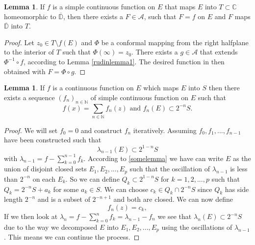 \documentclass[a4paper,12pt,twoside,BCOR=10mm]{scrbook}
\theoremstyle{definition}
\theoremstyle{definition}
\newtheorem{lemma}[theorem]{Lemma}
\theoremstyle{definition}
\begin{document}
\begin{lemma}
\label{rudinlemma2}
If $f$ is a simple continuous function on $E$ that maps $E$ into $T \subset \mathbb{C}$ homeomorphic to $\overline{\mathbb{D}}$, then there exists a $F \in \mathcal{A}$, such that $F = f$ on $E$ and $F$ maps $\overline{\mathbb{D}}$ into $T$.
\end{lemma}
\begin{proof}
Let $z_0 \in T \setminus f(E)$ and $\Phi$ be a conformal mapping from the right halfplane to the interior of $T$ such that $\Phi(\infty) = z_0$.
There exists a $g \in \mathcal{A}$ that extends $\Phi^{-1} \circ f$, according to Lemma \ref{rudinlemma1}.
The desired function in then obtained with $F = \Phi \circ g$.
\end{proof}
\begin{lemma}
\label{rudinlemma3}
If $f$ is a continuous function on $E$ which maps $E$ into $S$ then there exists a sequence $(f_n)_{n \in \mathbb{N}}$ of simple continuous function on $E$ such that
\[
	f(x) = \sum_{n \in \mathbb{N}} f_n(z)
	\text{ and }
	f_n(E) \subset 2^{-n}S.
\]
\end{lemma}
\begin{proof}
We will set $f_0 = 0$ and construct $f_n$ iteratively.
Assuming $f_0, f_1, ..., f_{n - 1}$ have been constructed such that
\[
	\lambda_{n - 1}(E) \subset 2^{1 - n}S
\]
with $\lambda_{n - 1} = f - \sum_{k = 0}^{n - 1}f_k$.
According to \ref{somelemma} we have can write $E$ as the union of disjoint closed sets $E_1, E_2, ..., E_p$ such that the oscillation of $\lambda_{n - 1}$ is less than $2^{-n}$ on each $E_k$.
So we can define $Q_k \subset 2^{1 - n}S$ for $k = 1, 2, ..., p$ such that $Q_k = 2^{-n}S + a_k$ for some $a_k \in S$.
We can choose $c_k \in Q_k \cap 2^{-n}S$ since $Q_k$ has side length $2^{-n}$ and is a subset of $2^{-n + 1}$ and both are closed.
We can now define
\[
	f_n(z) = c_k, \tag*{$z \in E_k,\ k = 1, 2, ..., p$.}
\]
If we then look at $\lambda_n = f - \sum_{k = 0}^nf_k = \lambda_{n - 1} - f_n$ we see that $\lambda_n(E) \subset 2^{-n}S$ due to the way we decomposed $E$ into $E_1, E_2, ..., E_p$ using the oscillations of $\lambda_{n - 1}$.
This means we can continue the process.
\end{proof}
\end{document}
